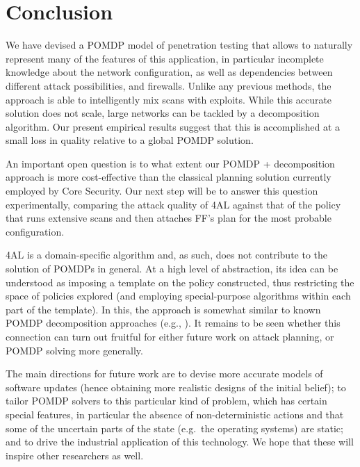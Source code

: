 \section{Conclusion}
\label{conclusion}

We have devised a POMDP model of penetration testing that allows to
naturally represent many of the features of this application, in
particular incomplete knowledge about the network configuration, as
well as dependencies between different attack possibilities, and
firewalls. Unlike any previous methods, the approach is able to
intelligently mix scans with exploits. While this accurate solution
does not scale, large networks can be tackled by a decomposition
algorithm. Our present empirical results suggest that this is
accomplished at a small loss in quality relative to a global POMDP
solution.

An important open question is to what extent our POMDP + decomposition
approach is more cost-effective than the classical planning solution
currently employed by Core Security. Our next step will be to answer
this question experimentally, comparing the attack quality of 4AL
against that of the policy that runs extensive scans and then attaches
FF's plan for the most probable configuration.

4AL is a domain-specific algorithm and, as such, does not contribute
to the solution of POMDPs in general. At a high level of abstraction,
its idea can be understood as imposing a template on the policy
constructed, thus restricting the space of policies explored (and
employing special-purpose algorithms within each part of the
template). In this, the approach is somewhat similar to known POMDP
decomposition approaches (e.g.,
\cite{PinGorThr-uai03,mueller:biundo:ki-11}). It remains to be seen
whether this connection can turn out fruitful for either future work
on attack planning, or POMDP solving more generally.

The main directions for future work are to devise more accurate models
of software updates (hence obtaining more realistic designs of the
initial belief); to tailor POMDP solvers to this particular kind of
problem, which has certain special features, in particular the absence
of non-deterministic actions and that some of the uncertain parts of
the state (e.g.\ the operating systems) are static; and to drive the
industrial application of this technology. We hope that these will
inspire other researchers as well.


